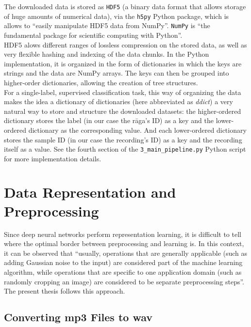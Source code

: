 The downloaded data is stored as \texttt{HDF5} (a binary data format that allows storage of huge amounts of numerical data), via the \texttt{h5py} Python package\cite{h5py}, which is allows to ``easily manipulate HDF5 data from NumPy''\cite{h5py}. \texttt{NumPy} is ``the fundamental package for scientific computing with Python''\cite{numpy}.\\

HDF5 alows different ranges of lossless compression on the stored data, as well as very flexible hashing and indexing of the data chunks. In the Python implementation, it is organized in the form of dictionaries in which the keys are strings and the data are NumPy arrays. The keys can then be grouped into higher-order dictionaries, allowing the creation of tree structures.\\

For a single-label, supervised classification task, this way of organizing the data makes the idea a dictionary of dictionaries (here abbreviated as {\it ddict}) a very natural way to store and structure the downloaded datasets: the higher-ordered dictionary stores the label (in our case the r\=aga's ID) as a key and the lower-ordered dictionary as the corresponding value. And each lower-ordered dictionary stores the sample ID (in our case the recording's ID) as a key and the recording itself as a value. See the fourth section of the \texttt{3\_main\_pipeline.py} Python script for more implementation details.

\section{Data Representation and Preprocessing}

Since deep neural networks perform representation learning, it is difficult to tell where the optimal border between preprocessing and learning is. In this context, it can be observed that ``usually, operations that are generally applicable (such as adding Gaussian noise to the input) are considered part of the machine learning algorithm, while operations that are specific to one application domain (such as randomly cropping an image) are considered to be separate preprocessing steps''\cite[p.242]{goodfellow}. The present thesis follows this approach.

\subsection{Converting mp3 Files to wav}


